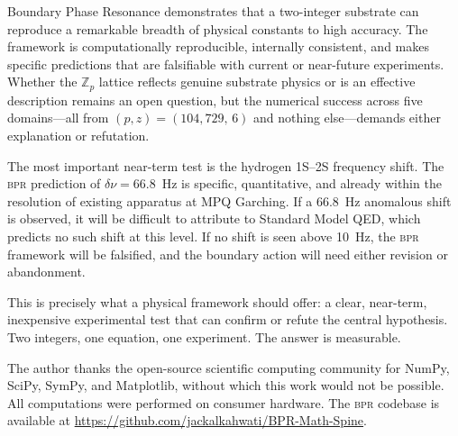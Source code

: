 \documentclass[aps,prd,twocolumn,superscriptaddress,longbibliography,nofootinbib]{revtex4-2}
\newcommand{\Zp}{\mathbb{Z}_p}
\newcommand{\bpr}{\textsc{bpr}}
\begin{document}
Boundary Phase Resonance demonstrates that a two-integer substrate
can reproduce a remarkable breadth of physical constants to high
accuracy.  The framework is computationally reproducible, internally
consistent, and makes specific predictions that are falsifiable with
current or near-future experiments.  Whether the $\Zp$ lattice
reflects genuine substrate physics or is an effective description
remains an open question, but the numerical success across five
domains---all from $(p, z) = (104{,}729,\, 6)$ and nothing
else---demands either explanation or refutation.

The most important near-term test is the hydrogen 1S--2S frequency
shift.  The \bpr{} prediction of $\delta\nu = 66.8$~Hz is specific,
quantitative, and already within the resolution of existing
apparatus at MPQ Garching.  If a 66.8~Hz anomalous shift is
observed, it will be difficult to attribute to Standard Model QED,
which predicts no such shift at this level.  If no shift is seen
above 10~Hz, the \bpr{} framework will be falsified, and the
boundary action will need either revision or abandonment.

This is precisely what a physical framework should offer: a clear,
near-term, inexpensive experimental test that can confirm or refute
the central hypothesis.  Two integers, one equation, one
experiment.  The answer is measurable.


\begin{acknowledgments}
The author thanks the open-source scientific computing community
for NumPy, SciPy, SymPy, and Matplotlib, without which this work
would not be possible.  All computations were performed on consumer
hardware.  The \bpr{} codebase is available at
\url{https://github.com/jackalkahwati/BPR-Math-Spine}.
\end{acknowledgments}
\end{document}
